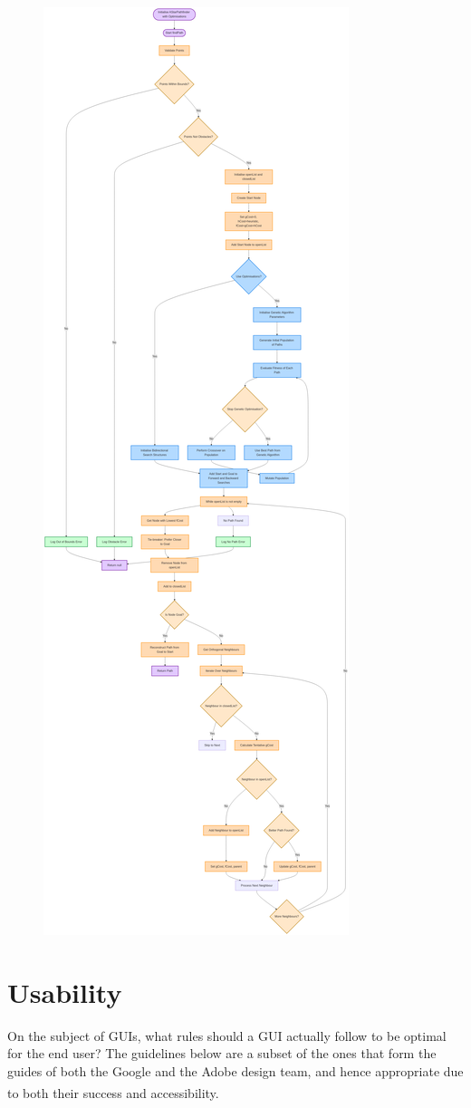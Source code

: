 \begin{figure}[!htbp]
	\centering
	\includegraphics[width=0.4\linewidth]{Flowcharts/optimisedastar.png}
\end{figure}

\newpage
\section{Usability}

On the subject of GUIs, what rules should a GUI actually follow to be optimal for the end user? The guidelines below are a subset of the ones that form the guides of both the Google and the Adobe design team, and hence appropriate due to both their success and accessibility. \textsuperscript{\cite{design1, design2}}

